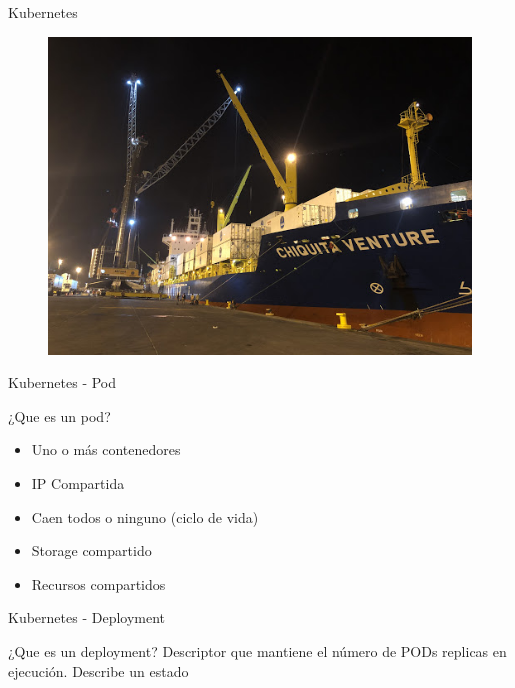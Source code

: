 \documentclass[aspectratio=169]{beamer}
\begin{document}
\begin{frame}{Kubernetes}
    \begin{figure}
        \centering
        \includegraphics[width=0.8\linewidth]{Images/kubquetzal}
    \end{figure}
\end{frame}



\begin{frame}{Kubernetes - Pod}

            \begin{alertblock}{¿Que es un pod?}
                \begin{itemize}
                    \item Uno o más contenedores
                    \item IP Compartida
                    \item Caen todos o ninguno (ciclo de vida)
                    \item Storage compartido
                    \item Recursos compartidos
                \end{itemize}
            \end{alertblock}

\end{frame}

\begin{frame}{Kubernetes - Deployment}

    \begin{alertblock}{¿Que es un deployment?}
        Descriptor que mantiene el número de PODs replicas en ejecución. Describe un estado
    \end{alertblock}

    
\end{frame}
\end{document}
